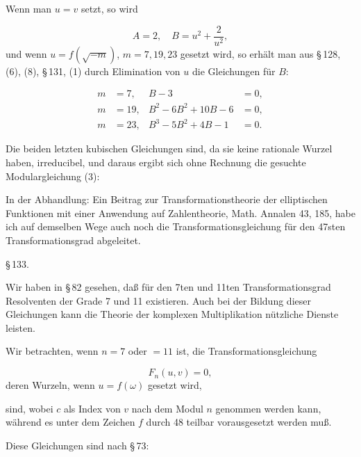 
Wenn man $u = v$ setzt, so wird

\[
A = 2, \quad B = u^2 + \frac{2}{u^2},
\]
und wenn $u = f(\sqrt{-m})$, $m = 7, 19, 23$ gesetzt wird, so erhält man aus \S\,128, (6), (8), \S\,131, (1) durch Elimination von $u$ die Gleichungen für $B$:

\[
\begin{aligned}
m &= 7, & B - 3 &= 0, \\
m &= 19, & B^2 - 6B^2 + 10B - 6 &= 0, \\ %
m &= 23, & B^3 - 5B^2 + 4B - 1 &= 0.
\end{aligned}
\]

Die beiden letzten kubischen Gleichungen sind, da sie keine rationale Wurzel haben, irreducibel, und daraus ergibt sich ohne Rechnung die gesuchte Modulargleichung (3):


In der Abhandlung: \glqq Ein Beitrag zur Transformationstheorie der elliptischen Funktionen mit einer Anwendung auf Zahlentheorie\grqq{}, Math. Annalen 43, 185, habe ich auf demselben Wege auch noch die Transformationsgleichung für den 47sten Transformationsgrad abgeleitet.

\begin{center}
\S\,133. 
\end{center}

Wir haben in \S\,82 gesehen, daß für den 7ten und 11ten Transformationsgrad Resolventen der Grade 7 und 11 existieren. Auch bei der Bildung dieser Gleichungen kann die Theorie der komplexen Multiplikation nützliche Dienste leisten.

Wir betrachten, wenn $n = 7$ oder $= 11$ ist, die Transformationsgleichung

\[
F_n(u, v) = 0,
\]
deren Wurzeln, wenn $u = f(\omega)$ gesetzt wird,


sind, wobei $c$ als Index von $v$ nach dem Modul $n$ genommen werden kann, während es unter dem Zeichen $f$ durch 48 teilbar vorausgesetzt werden muß.

Diese Gleichungen sind nach \S\,73:


